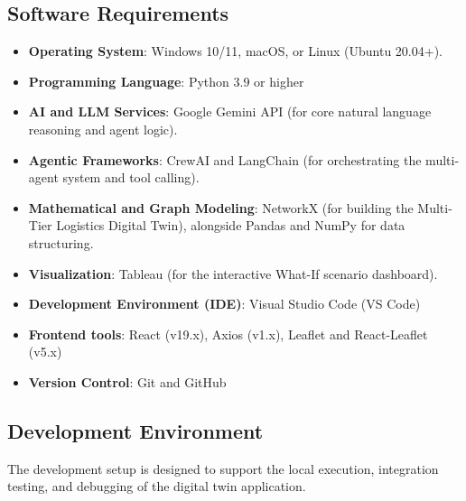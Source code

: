 \subsection[Software Requirements]{Software Requirements}
\begin{itemize}
    \item \textbf{Operating System}: Windows 10/11, macOS, or Linux (Ubuntu 20.04+).
    \item \textbf{Programming Language}: Python 3.9 or higher
    \item \textbf{AI and LLM Services}: Google Gemini API (for core natural language reasoning and agent logic).
    \item \textbf{Agentic Frameworks}: CrewAI and LangChain (for orchestrating the multi-agent system and tool calling).
    \item \textbf{Mathematical and Graph Modeling}: NetworkX (for building the Multi-Tier Logistics Digital Twin), alongside Pandas and NumPy for data structuring.
    \item \textbf{Visualization}: Tableau (for the interactive What-If scenario dashboard).
    \item \textbf{Development Environment (IDE)}: Visual Studio Code (VS Code)
    \item \textbf{Frontend tools}: React (v19.x), Axios (v1.x), Leaflet and React-Leaflet (v5.x)
    \item \textbf{Version Control}: Git and GitHub
\end{itemize}


\subsection[Development Environment]{Development Environment}

The development setup is designed to support the local execution, integration testing, and debugging of the digital twin application.

